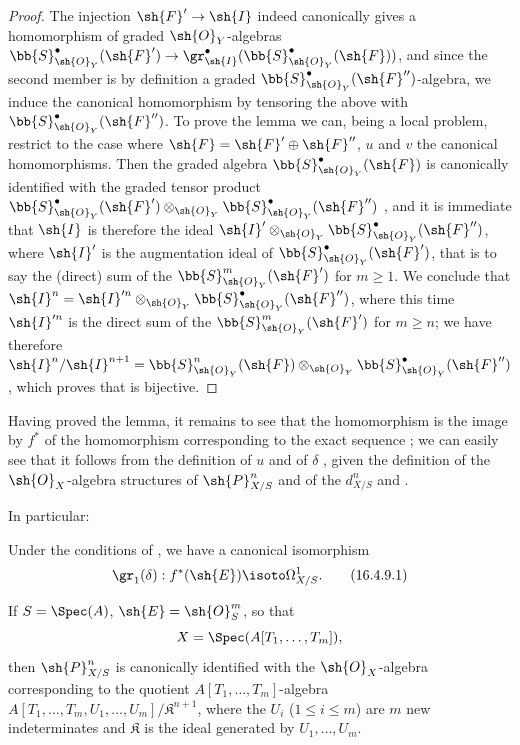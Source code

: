 \begin{proof}
The injection $\sh{F}' \to \sh{I}$ indeed canonically gives a homomorphism of graded $\sh{O}_Y$-algebras $\bb{S}_{\sh{O}_Y}^\bullet(\sh{F}') \to \gr_\sh{I}^\bullet(\bb{S}_{\sh{O}_Y}^\bullet(\sh{F}))$, and since the second member is by definition a graded $\bb{S}_{\sh{O}_Y}^\bullet(\sh{F}'')$-algebra, we induce the canonical homomorphism  by tensoring the above with $\bb{S}_{\sh{O}_Y}^\bullet(\sh{F}'')$.
To prove the lemma we can, being a local problem, restrict to the case where $\sh{F} = \sh{F}' \oplus \sh{F}''$, $u$ and $v$ the canonical homomorphisms.
Then the graded algebra $\bb{S}_{\sh{O}_Y}^\bullet(\sh{F})$ is canonically identified with the graded tensor product $\bb{S}_{\sh{O}_Y}^\bullet(\sh{F}') \otimes_{\sh{O}_Y} \bb{S}_{\sh{O}_Y}^\bullet(\sh{F}'')$ , and it is immediate that $\sh{I}$ is therefore the ideal $\sh{I}' \otimes_{\sh{O}_Y} \bb{S}_{\sh{O}_Y}^\bullet(\sh{F}'')$, where $\sh{I}'$ is the augmentation ideal of $\bb{S}_{\sh{O}_Y}^\bullet(\sh{F}')$, that is to say the (direct) sum of the $\bb{S}_{\sh{O}_Y}^m(\sh{F}')$ for $m \geq 1$.
We conclude that $\sh{I}^n = \sh{I}'^n \otimes_{\sh{O}_Y} \bb{S}_{\sh{O}_Y}^\bullet(\sh{F}'')$, where this time $\sh{I}'^n$ is the direct sum of the $\bb{S}_{\sh{O}_Y}^m(\sh{F}')$ for $m \geq n$;
we have therefore $\sh{I}^n/\sh{I}^{n+1} = \bb{S}_{\sh{O}_Y}^n(\sh{F}) \otimes_{\sh{O}_Y} \bb{S}_{\sh{O}_Y}^\bullet(\sh{F}'')$, which proves that  is bijective.
\end{proof}

Having proved the lemma, it remains to see that the homomorphism  is the image by $f^*$ of the homomorphism  corresponding to the exact sequence ;
we can easily see that it follows from the definition of $u$  and of $\delta$ , given the definition of the $\sh{O}_X$-algebra structures of $\sh{P}_{X/S}^n$ and of the $d_{X/S}^n$  and .

In particular:

\begin{corollary}[16.4.9]
\label{IV.16.4.9}
Under the conditions of , we have a canonical isomorphism
\[
\label{IV.16.4.9.1}
  \gr_1(\delta): f^*(\sh{E}) \isoto \Omega_{X/S}^1.
  \tag{16.4.9.1}
\]
\end{corollary}

\begin{corollary}[16.4.10]
\label{IV.16.4.10}
If $S = \Spec(A)$, $\sh{E} = \sh{O}_S^m$, so that
\[
  X = \Spec(A[T_1, \dots, T_m]),
\]
then $\sh{P}_{X/S}^n$ is canonically identified with the $\sh{O}_X$-algebra corresponding to the quotient $A[T_1, \dots, T_m]$-algebra\\
$A[T_1, \dots, T_m, U_1, \dots, U_m]/\mathfrak{K}^{n+1}$, where the $U_i$ ($1 \leq i \leq m$) are $m$ new indeterminates and $\mathfrak{K}$ is the ideal generated by $U_1, \dots, U_m$.
\end{corollary}

